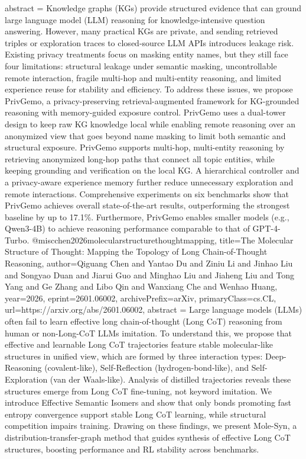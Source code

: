 {      abstract = {Knowledge graphs (KGs) provide structured evidence that can ground large language model (LLM) reasoning for knowledge-intensive question answering. However, many practical KGs are private, and sending retrieved triples or exploration traces to closed-source LLM APIs introduces leakage risk. Existing privacy treatments focus on masking entity names, but they still face four limitations: structural leakage under semantic masking, uncontrollable remote interaction, fragile multi-hop and multi-entity reasoning, and limited experience reuse for stability and efficiency. To address these issues, we propose PrivGemo, a privacy-preserving retrieval-augmented framework for KG-grounded reasoning with memory-guided exposure control. PrivGemo uses a dual-tower design to keep raw KG knowledge local while enabling remote reasoning over an anonymized view that goes beyond name masking to limit both semantic and structural exposure. PrivGemo supports multi-hop, multi-entity reasoning by retrieving anonymized long-hop paths that connect all topic entities, while keeping grounding and verification on the local KG. A hierarchical controller and a privacy-aware experience memory further reduce unnecessary exploration and remote interactions. Comprehensive experiments on six benchmarks show that PrivGemo achieves overall state-of-the-art results, outperforming the strongest baseline by up to 17.1\%. Furthermore, PrivGemo enables smaller models (e.g., Qwen3-4B) to achieve reasoning performance comparable to that of GPT-4-Turbo.}
}@misc{chen2026molecularstructurethoughtmapping,
      title={The Molecular Structure of Thought: Mapping the Topology of Long Chain-of-Thought Reasoning}, 
      author={Qiguang Chen and Yantao Du and Ziniu Li and Jinhao Liu and Songyao Duan and Jiarui Guo and Minghao Liu and Jiaheng Liu and Tong Yang and Ge Zhang and Libo Qin and Wanxiang Che and Wenhao Huang},
      year={2026},
      eprint={2601.06002},
      archivePrefix={arXiv},
      primaryClass={cs.CL},
      url={https://arxiv.org/abs/2601.06002},
      abstract = {Large language models (LLMs) often fail to learn effective long chain-of-thought (Long CoT) reasoning from human or non-Long-CoT LLMs imitation. To understand this, we propose that effective and learnable Long CoT trajectories feature stable molecular-like structures in unified view, which are formed by three interaction types: Deep-Reasoning (covalent-like), Self-Reflection (hydrogen-bond-like), and Self-Exploration (van der Waals-like). Analysis of distilled trajectories reveals these structures emerge from Long CoT fine-tuning, not keyword imitation. We introduce Effective Semantic Isomers and show that only bonds promoting fast entropy convergence support stable Long CoT learning, while structural competition impairs training. Drawing on these findings, we present Mole-Syn, a distribution-transfer-graph method that guides synthesis of effective Long CoT structures, boosting performance and RL stability across benchmarks.}
}
